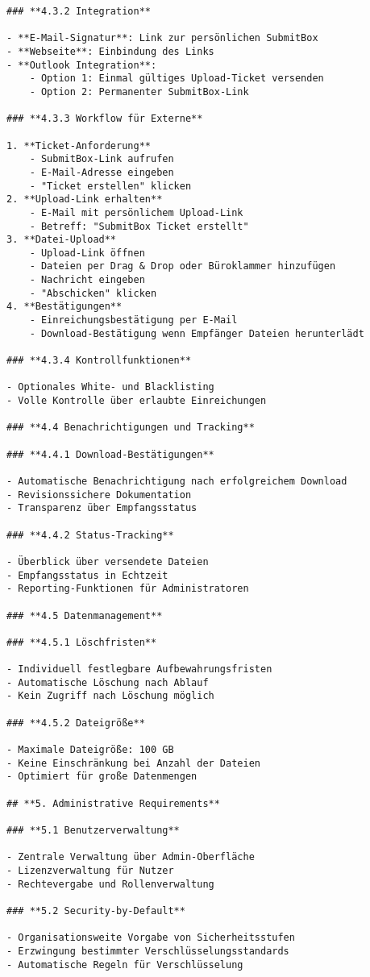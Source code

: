 \begin{Verbatim}[breaklines=true]
### **4.3.2 Integration**

- **E-Mail-Signatur**: Link zur persönlichen SubmitBox
- **Webseite**: Einbindung des Links
- **Outlook Integration**:
    - Option 1: Einmal gültiges Upload-Ticket versenden
    - Option 2: Permanenter SubmitBox-Link

### **4.3.3 Workflow für Externe**

1. **Ticket-Anforderung**
    - SubmitBox-Link aufrufen
    - E-Mail-Adresse eingeben
    - "Ticket erstellen" klicken
2. **Upload-Link erhalten**
    - E-Mail mit persönlichem Upload-Link
    - Betreff: "SubmitBox Ticket erstellt"
3. **Datei-Upload**
    - Upload-Link öffnen
    - Dateien per Drag & Drop oder Büroklammer hinzufügen
    - Nachricht eingeben
    - "Abschicken" klicken
4. **Bestätigungen**
    - Einreichungsbestätigung per E-Mail
    - Download-Bestätigung wenn Empfänger Dateien herunterlädt

### **4.3.4 Kontrollfunktionen**

- Optionales White- und Blacklisting
- Volle Kontrolle über erlaubte Einreichungen

### **4.4 Benachrichtigungen und Tracking**

### **4.4.1 Download-Bestätigungen**

- Automatische Benachrichtigung nach erfolgreichem Download
- Revisionssichere Dokumentation
- Transparenz über Empfangsstatus

### **4.4.2 Status-Tracking**

- Überblick über versendete Dateien
- Empfangsstatus in Echtzeit
- Reporting-Funktionen für Administratoren

### **4.5 Datenmanagement**

### **4.5.1 Löschfristen**

- Individuell festlegbare Aufbewahrungsfristen
- Automatische Löschung nach Ablauf
- Kein Zugriff nach Löschung möglich

### **4.5.2 Dateigröße**

- Maximale Dateigröße: 100 GB
- Keine Einschränkung bei Anzahl der Dateien
- Optimiert für große Datenmengen

## **5. Administrative Requirements**

### **5.1 Benutzerverwaltung**

- Zentrale Verwaltung über Admin-Oberfläche
- Lizenzverwaltung für Nutzer
- Rechtevergabe und Rollenverwaltung

### **5.2 Security-by-Default**

- Organisationsweite Vorgabe von Sicherheitsstufen
- Erzwingung bestimmter Verschlüsselungsstandards
- Automatische Regeln für Verschlüsselung


\end{Verbatim}
